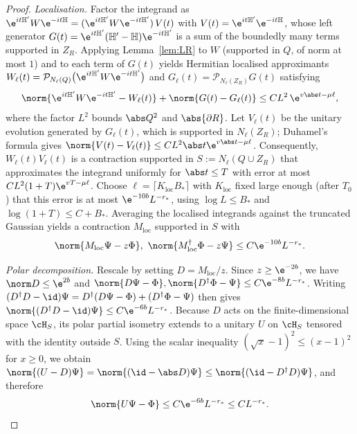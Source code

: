 \begin{proof}
\emph{Localisation.} Factor the integrand as
$\e^{it\mathbb H'}W\e^{-it\mathbb H}=(\e^{it\mathbb H'}W\e^{-it\mathbb H'})\,V(t)$
with $V(t)=\e^{it\mathbb H'}\e^{-it\mathbb H}$, whose left generator
$G(t)=\e^{it\mathbb H'}(\mathbb H'-\mathbb H)\e^{-it\mathbb H'}$ is a sum of
the boundedly many terms supported in $Z_R$. Applying Lemma~\ref{lem:LR} to $W$ (supported in $Q$, of norm at most $1$)
and to each term of $G(t)$ yields Hermitian localised approximants
$W_\ell(t)=\mathcal P_{N_\ell(Q)}\bigl(\e^{it\mathbb H'}W\e^{-it\mathbb H'}\bigr)$
and $G_\ell(t)=\mathcal P_{N_\ell(Z_R)}G(t)$ satisfying
\[
 \norm{\e^{it\mathbb H'}W\e^{-it\mathbb H'}-W_\ell(t)}+\norm{G(t)-G_\ell(t)}\le CL^2\,\e^{v\abs t-\mu\ell},
\]
where the factor $L^2$ bounds $\abs Q^2$ and $\abs{\partial R}$. Let
$V_\ell(t)$ be the unitary evolution generated by $G_\ell(t)$, which is supported in
$N_\ell(Z_R)$; Duhamel's formula gives $\norm{V(t)-V_\ell(t)}\le CL^2\abs t\e^{v\abs t-\mu\ell}$.
Consequently, $W_\ell(t)V_\ell(t)$ is a contraction supported in
$S:=N_\ell(Q\cup Z_R)$ that approximates the integrand uniformly for
$\abs t\le T$ with error at most $CL^2(1+T)\e^{vT-\mu\ell}$. Choose
$\ell=\lceil K_{\mathrm{loc}}B_*\rceil$ with $K_{\mathrm{loc}}$ fixed large
enough (after $T_0$) that this error is at most $\e^{-10b}L^{-r_*}$,
using $\log L\le B_*$ and $\log(1+T)\le C+B_*$. Averaging the localised
integrands against the truncated Gaussian yields a contraction
$M_{\mathrm{loc}}$ supported in $S$ with
\begin{equation}\label{eq:loctwosided}
 \norm{M_{\mathrm{loc}}\Psi-z\Phi},\ \norm{M_{\mathrm{loc}}^\dagger\Phi-z\Psi}\le C\e^{-10b}L^{-r_*}.
\end{equation}

\emph{Polar decomposition.} Rescale by setting $D=M_{\mathrm{loc}}/z$. Since $z\ge\e^{-2b}$, we have $\norm D\le\e^{2b}$ and
$\norm{D\Psi-\Phi},\norm{D^\dagger\Phi-\Psi}\le C\e^{-8b}L^{-r_*}$. Writing
$(D^\dagger D-\id)\Psi=D^\dagger(D\Psi-\Phi)+(D^\dagger\Phi-\Psi)$ then gives
$\norm{(D^\dagger D-\id)\Psi}\le C\e^{-6b}L^{-r_*}$. Because $D$ acts on the finite-dimensional space $\cH_S$, its polar partial
isometry extends to a unitary $U$ on
$\cH_S$ tensored with the
identity outside $S$. Using the scalar inequality $(\sqrt x-1)^2\le(x-1)^2$ for $x\ge0$, we obtain
$\norm{(U-D)\Psi}=\norm{(\id-\abs D)\Psi}\le\norm{(\id-D^\dagger D)\Psi}$, and therefore
\begin{equation}\label{eq:Uerror}
 \norm{U\Psi-\Phi}\le C\e^{-6b}L^{-r_*}\le CL^{-r_*}.
\end{equation}


\end{proof}
